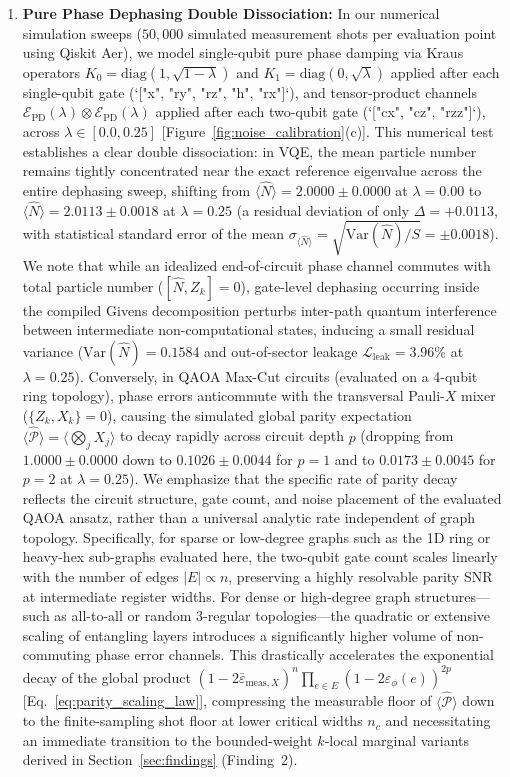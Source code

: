 \documentclass[aps,pra,reprint,superscriptaddress,floatfix,nofootinbib]{revtex4-2}
\begin{document}
\begin{enumerate}
    \item \textbf{Pure Phase Dephasing Double Dissociation:} In our numerical simulation sweeps ($50,000$ simulated measurement shots per evaluation point using Qiskit Aer), we model single-qubit pure phase damping via Kraus operators $K_0 = \text{diag}(1, \sqrt{1-\lambda})$ and $K_1 = \text{diag}(0, \sqrt{\lambda})$ applied after each single-qubit gate (`["x", "ry", "rz", "h", "rx"]`), and tensor-product channels $\mathcal{E}_{\text{PD}}(\lambda) \otimes \mathcal{E}_{\text{PD}}(\lambda)$ applied after each two-qubit gate (`["cx", "cz", "rzz"]`), across $\lambda \in [0.0, 0.25]$ [Figure~\ref{fig:noise_calibration}(c)]. This numerical test establishes a clear double dissociation: in VQE, the mean particle number remains tightly concentrated near the exact reference eigenvalue across the entire dephasing sweep, shifting from $\langle \hat{N} \rangle = 2.0000 \pm 0.0000$ at $\lambda = 0.00$ to $\langle \hat{N} \rangle = 2.0113 \pm 0.0018$ at $\lambda = 0.25$ (a residual deviation of only $\Delta = +0.0113$, with statistical standard error of the mean $\sigma_{\langle \hat{N} \rangle} = \sqrt{\text{Var}(\hat{N})/S} = \pm 0.0018$). We note that while an idealized end-of-circuit phase channel commutes with total particle number ($[\hat{N}, Z_k] = 0$), gate-level dephasing occurring inside the compiled Givens decomposition perturbs inter-path quantum interference between intermediate non-computational states, inducing a small residual variance ($\text{Var}(\hat{N}) = 0.1584$ and out-of-sector leakage $\mathcal{L}_{\text{leak}} = 3.96\%$ at $\lambda = 0.25$). Conversely, in QAOA Max-Cut circuits (evaluated on a 4-qubit ring topology), phase errors anticommute with the transversal Pauli-$X$ mixer ($\{Z_k, X_k\} = 0$), causing the simulated global parity expectation $\langle \hat{\mathcal{P}} \rangle = \langle \bigotimes_j X_j \rangle$ to decay rapidly across circuit depth $p$ (dropping from $1.0000 \pm 0.0000$ down to $0.1026 \pm 0.0044$ for $p=1$ and to $0.0173 \pm 0.0045$ for $p=2$ at $\lambda = 0.25$). We emphasize that the specific rate of parity decay reflects the circuit structure, gate count, and noise placement of the evaluated QAOA ansatz, rather than a universal analytic rate independent of graph topology. Specifically, for sparse or low-degree graphs such as the 1D ring or heavy-hex sub-graphs evaluated here, the two-qubit gate count scales linearly with the number of edges $|E| \propto n$, preserving a highly resolvable parity SNR at intermediate register widths. For dense or high-degree graph structures---such as all-to-all or random 3-regular topologies---the quadratic or extensive scaling of entangling layers introduces a significantly higher volume of non-commuting phase error channels. This drastically accelerates the exponential decay of the global product $(1 - 2\bar{\varepsilon}_{\text{meas},X})^n \prod_{e \in E} (1 - 2\varepsilon_\phi(e))^{2p}$ [Eq.~\eqref{eq:parity_scaling_law}], compressing the measurable floor of $\langle\hat{\mathcal{P}}\rangle$ down to the finite-sampling shot floor at lower critical widths $n_{c}$ and necessitating an immediate transition to the bounded-weight $k$-local marginal variants derived in Section~\ref{sec:findings} (Finding~2).
    

\end{enumerate}
\end{document}
